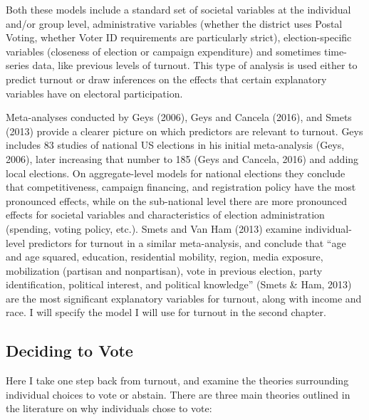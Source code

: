 \documentclass[12pt,twoside]{reedthesis}
\begin{document}
  Both these models include a standard set of societal variables at the
  individual and/or group level, administrative variables (whether the
  district uses Postal Voting, whether Voter ID requirements are
  particularly strict), election-specific variables (closeness of election
  or campaign expenditure) and sometimes time-series data, like previous
  levels of turnout. This type of analysis is used either to predict
  turnout or draw inferences on the effects that certain explanatory
  variables have on electoral participation.
  
  Meta-analyses conducted by Geys (2006), Geys and Cancela (2016), and
  Smets (2013) provide a clearer picture on which predictors are relevant
  to turnout. Geys includes 83 studies of national US elections in his
  initial meta-analysis (Geys, 2006), later increasing that number to 185
  (Geys and Cancela, 2016) and adding local elections. On aggregate-level
  models for national elections they conclude that competitiveness,
  campaign financing, and registration policy have the most pronounced
  effects, while on the sub-national level there are more pronounced
  effects for societal variables and characteristics of election
  administration (spending, voting policy, etc.). Smets and Van Ham (2013)
  examine individual-level predictors for turnout in a similar
  meta-analysis, and conclude that ``age and age squared, education,
  residential mobility, region, media exposure, mobilization (partisan and
  nonpartisan), vote in previous election, party identification, political
  interest, and political knowledge'' (Smets \& Ham, 2013) are the most
  significant explanatory variables for turnout, along with income and
  race. I will specify the model I will use for turnout in the second
  chapter.
  
  \subsection{Deciding to Vote}\label{deciding-to-vote}
  
  Here I take one step back from turnout, and examine the theories
  surrounding individual choices to vote or abstain. There are three main
  theories outlined in the literature on why individuals chose to vote:
  
\end{document}
